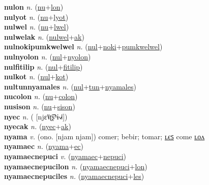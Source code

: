 \textbf{nulon} \textit{n.} (\hyperref[nu]{nu}+\hyperref[lon]{lon})
 \label{nulon} \\
\textbf{nulyot} \textit{n.} (\hyperref[nu]{nu}+\hyperref[lyot]{lyot})
 \label{nulyot} \\
\textbf{nulwel} \textit{n.} (\hyperref[nu]{nu}+\hyperref[lwel]{lwel})
 \label{nulwel} \\
\textbf{nulwelak} \textit{n.} (\hyperref[nulwel]{nulwel}+\hyperref[ak]{ak})
 \label{nulwelak} \\
\textbf{nulnokipumkwelwel} \textit{n.} (\hyperref[nul]{nul}+\hyperref[noki]{noki}+\hyperref[pumkwelwel]{pumkwelwel})
 \label{nulnokipumkwelwel} \\
\textbf{nulnyolon} \textit{n.} (\hyperref[nul]{nul}+\hyperref[nyolon]{nyolon})
 \label{nulnyolon} \\
\textbf{nulfitilip} \textit{n.} (\hyperref[nul]{nul}+\hyperref[fitilip]{fitilip})
 \label{nulfitilip} \\
\textbf{nulkot} \textit{n.} (\hyperref[nul]{nul}+\hyperref[kot]{kot})
 \label{nulkot} \\
\textbf{nultunnyamales} \textit{n.} (\hyperref[nul]{nul}+\hyperref[tun]{tun}+\hyperref[nyamales]{nyamales})
 \label{nultunnyamales} \\
\textbf{nucolon} \textit{n.} (\hyperref[nu]{nu}+\hyperref[colon]{colon})
 \label{nucolon} \\
\textbf{nusison} \textit{n.} (\hyperref[nu]{nu}+\hyperref[sison]{sison})
 \label{nusison} \\
\textbf{nyec} \textit{n.} ( [njɛ˥˩ʈ͡ʂʰɨ˧˩˧])
 \label{nyec} \\
\textbf{nyecak} \textit{n.} (\hyperref[nyec]{nyec}+\hyperref[ak]{ak})
 \label{nyecak} \\
\textbf{nyama} \textit{v.} (ono. [njam njam])
comer; bebir; tomar; \hyperref[nyamales]{ʟєꜱ} come \hyperref[nyamalon]{ʟᴏᴧ} \label{nyama} \\
\textbf{nyamaec} \textit{n.} (\hyperref[nyama]{nyama}+\hyperref[ec]{ec})
 \label{nyamaec} \\
\textbf{nyamaecnepuci} \textit{v.} (\hyperref[nyamaec]{nyamaec}+\hyperref[nepuci]{nepuci})
 \label{nyamaecnepuci} \\
\textbf{nyamaecnepucilon} \textit{n.} (\hyperref[nyamaecnepuci]{nyamaecnepuci}+\hyperref[lon]{lon})
 \label{nyamaecnepucilon} \\
\textbf{nyamaecnepuciles} \textit{n.} (\hyperref[nyamaecnepuci]{nyamaecnepuci}+\hyperref[les]{les})
 \label{nyamaecnepuciles} \\
